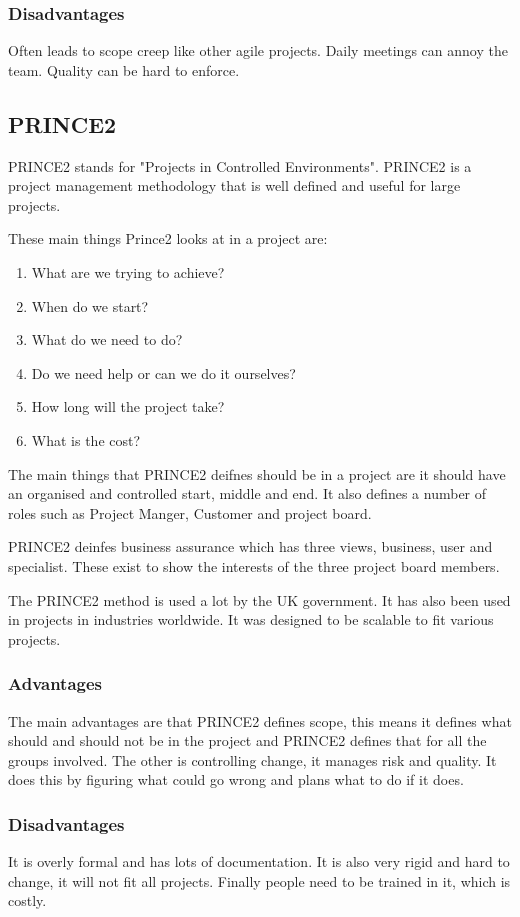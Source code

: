 \documentclass{article}
\begin{document}
\subsubsection{Disadvantages}
Often leads to scope creep like other agile projects. Daily meetings can annoy the team. Quality can be hard to enforce.

\subsection{PRINCE2}
PRINCE2 stands for "Projects in Controlled Environments". PRINCE2 is a project management methodology that is well defined and useful for large projects.

These main things Prince2 looks at in a project are:
\begin{enumerate}
    \item What are we trying to achieve?
    \item When do we start?
    \item What do we need to do?
    \item Do we need help or can we do it ourselves?
    \item How long will the project take?
    \item What is the cost?
\end{enumerate}

The main things that PRINCE2 deifnes should be in a project are it should have an organised and controlled start, middle and end.
It also defines a number of roles such as Project Manger, Customer and project board.

PRINCE2 deinfes business assurance which has three views, business, user and specialist. These exist to show the interests of the three project board members.

The PRINCE2 method is used a lot by the UK government. It has also been used in projects in industries worldwide. It was designed to be scalable to fit various projects.

\subsubsection{Advantages}
The main advantages are that PRINCE2 defines scope, this means it defines what should and should not be in the project and PRINCE2 defines that for all the groups involved. The other is controlling change, it manages risk and quality. It does this by figuring what could go wrong and plans what to do if it does.
\subsubsection{Disadvantages}
It is overly formal and has lots of documentation. It is also very rigid and hard to change, it will not fit all projects. Finally people need to be trained in it, which is costly.
\end{document}
